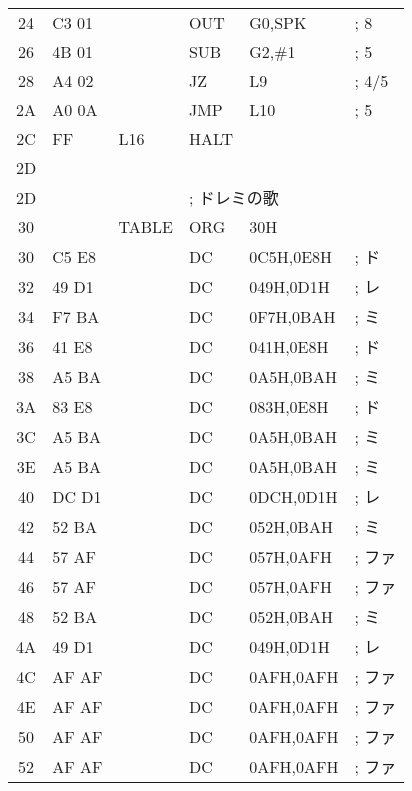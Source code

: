 \begin{center}
{\begin{tabular}{|c|l|l|l l l|}
24 & C3 01        &         & OUT    & G0,SPK      &   ; 8\\
26 & 4B 01        &         & SUB    & G2,\#1      &  ; 5\\
28 & A4 02        &         & JZ     & L9          &   ; 4/5\\
2A & A0 0A        &         & JMP    & L10         &   ; 5\\
2C & FF           &  L16    & HALT   &             &   \\
2D &              &         &        &             &   \\
2D &              &         & \multicolumn{3}{|l|}{; ドレミの歌} \\
30 &              &  TABLE  & ORG    & 30H         &   \\
30 & C5 E8        &         & DC     & 0C5H,0E8H   &   ; ド\\
32 & 49 D1        &         & DC     & 049H,0D1H   &   ; レ\\
34 & F7 BA        &         & DC     & 0F7H,0BAH   &   ; ミ\\
36 & 41 E8        &         & DC     & 041H,0E8H   &   ; ド\\
38 & A5 BA        &         & DC     & 0A5H,0BAH   &   ; ミ\\
3A & 83 E8        &         & DC     & 083H,0E8H   &   ; ド\\
3C & A5 BA        &         & DC     & 0A5H,0BAH   &   ; ミ\\
3E & A5 BA        &         & DC     & 0A5H,0BAH   &   ; ミ\\
40 & DC D1        &         & DC     & 0DCH,0D1H   &   ; レ\\
42 & 52 BA        &         & DC     & 052H,0BAH   &   ; ミ\\
44 & 57 AF        &         & DC     & 057H,0AFH   &   ; ファ\\
46 & 57 AF        &         & DC     & 057H,0AFH   &   ; ファ\\
48 & 52 BA        &         & DC     & 052H,0BAH   &   ; ミ\\
4A & 49 D1        &         & DC     & 049H,0D1H   &   ; レ\\
4C & AF AF        &         & DC     & 0AFH,0AFH   &   ; ファ\\
4E & AF AF        &         & DC     & 0AFH,0AFH   &   ; ファ\\
50 & AF AF        &         & DC     & 0AFH,0AFH   &   ; ファ\\
52 & AF AF        &         & DC     & 0AFH,0AFH   &   ; ファ\\

\end{tabular}}
\end{center}
